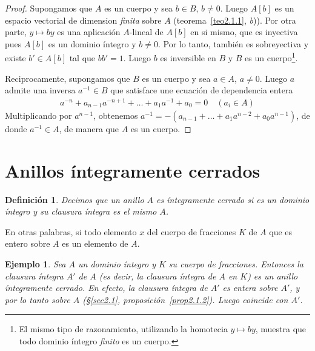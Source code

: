 \documentclass[oneside,bibtotoc,leqno,spanish]{amsbook}
\numberwithin{equation}{section}
\theoremstyle{defi}
\newtheorem*{definition*}{Definici\'on}
\theoremstyle{note}
\theoremstyle{rem}
\newtheorem{example}{Ejemplo}
\numberwithin{theorem}{section}
\numberwithin{proposition}{section}
\numberwithin{definition}{section}
\numberwithin{lemma}{section}
\numberwithin{corollary}{section}
\numberwithin{example}{section}
\numberwithin{footnote}{section}%
\begin{document}
\begin{proof}
Supongamos que $A$ es un cuerpo y sea $b\in B$, $b\neq 0$. Luego $A[b]$ es un espacio vectorial de
dimension {\em finita} sobre $A$ (teorema~\ref{teo2.1.1}, {\itshape b})).
Por otra parte, $y\mapsto by$ es una aplicaci\'on
$A$-lineal de $A[b]$ en si mismo, que es inyectiva pues $A[b]$ es un dominio \'integro y $b\neq 0$. Por
lo tanto, tambi\'en es sobreyectiva y existe $b'\in A[b]$ tal que $bb' =1$. Luego $b$ es inversible en $B$
y $B$ es un cuerpo\footnote{El mismo tipo de razonamiento, utilizando la homotecia $y\mapsto by$, muestra
que todo dominio \'integro {\em finito} es un cuerpo.}.

Reciprocamente, supongamos que $B$ es un cuerpo y sea $a\in A$, $a\neq 0$. Luego $a$ admite una inversa
$a^{-1}\in B$ que satisface une ecuaci\'on de dependencia entera
\begin{gather*}
a^{-n}+a_{n-1}a^{-n+1}+\dots+a_{1}a^{-1}+a_{0} =0\quad(a_{i}\in A)
\end{gather*}
Multiplicando por $a^{n-1}$, obtenemos $a^{-1}=-(a_{n-1}+\dots+a_{1}a^{n-2}+a_{0}a^{n-1})$, de donde
$a^{-1}\in A$, de manera que $A$ es un cuerpo.
\end{proof}

\section{Anillos \'integramente cerrados}\label{sec2.2}

\begin{definition*}
Decimos que un anillo $A$ es \'integramente cerrado si es un dominio \'integro y su clausura \'integra es
el mismo $A$.
\end{definition*}

En otras palabras, si todo elemento $x$ del cuerpo de fracciones $K$ de $A$ que es entero sobre $A$
es un elemento de $A$.

\begin{example}
Sea $A$ un dominio \'integro y $K$ su cuerpo de fracciones. Entonces la {\em clausura \'integra} $A'$
de $A$ (es decir, la clausura \'integra de $A$ en $K$) es un anillo \'integramente cerrado. En efecto, la
clausura \'integra de $A'$ es entera sobre $A'$, y por lo tanto sobre $A$ (\S\ref{sec2.1}, proposici\'on~\ref{prop2.1.2}).
Luego coincide con $A'$.
\end{example}
\end{document}
